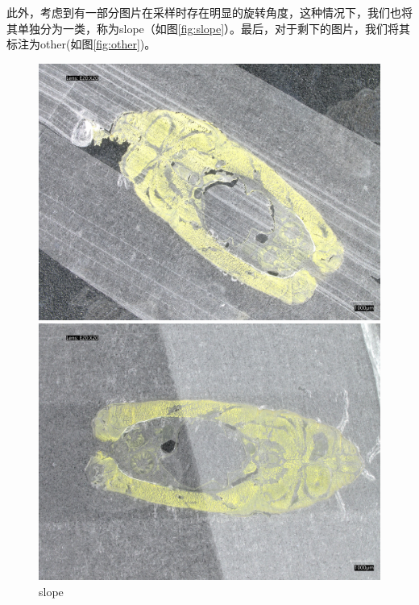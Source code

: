 此外，考虑到有一部分图片在采样时存在明显的旋转角度，这种情况下，我们也将其单独分为一类，称为slope（如图\autoref{fig:slope}）。最后，对于剩下的图片，我们将其标注为other(如图\autoref{fig:other})。

\begin{figure}[H]
    \centering
    \begin{minipage}{0.32\textwidth}
        \centering
        \includegraphics[width=\textwidth]{./fig/sample_1/slope.jpg}
        \caption{slope}
        \label{fig:slope}
    \end{minipage}
    \begin{minipage}{0.32\textwidth}
        \centering
        \includegraphics[width=\textwidth]{./fig/sample_1/other.jpg}

\end{minipage}
\end{figure}
